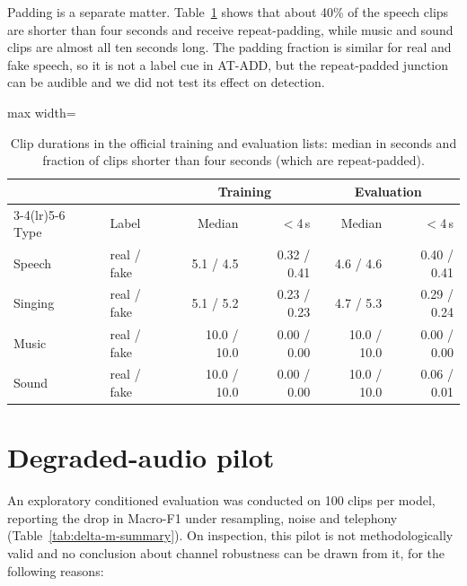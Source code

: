 Padding is a separate matter. Table~\ref{tab:durations} shows that about 40\% of the speech clips are shorter than four seconds and receive repeat-padding, while music and sound clips are almost all ten seconds long. The padding fraction is similar for real and fake speech, so it is not a label cue in AT-ADD, but the repeat-padded junction can be audible and we did not test its effect on detection.

\begin{table}[htbp]
\centering
\caption{Clip durations in the official training and evaluation lists: median in seconds and fraction of clips shorter than four seconds (which are repeat-padded).}
\label{tab:durations}
\small
\begin{adjustbox}{max width=\textwidth}
\begin{tabular}{@{}llrrrr@{}}
\toprule
 & & \multicolumn{2}{c}{Training} & \multicolumn{2}{c}{Evaluation} \\
\cmidrule(lr){3-4}\cmidrule(lr){5-6}
Type & Label & Median & $<$4\,s & Median & $<$4\,s \\
\midrule
Speech & real / fake & 5.1 / 4.5 & 0.32 / 0.41 & 4.6 / 4.6 & 0.40 / 0.41 \\
Singing & real / fake & 5.1 / 5.2 & 0.23 / 0.23 & 4.7 / 5.3 & 0.29 / 0.24 \\
Music & real / fake & 10.0 / 10.0 & 0.00 / 0.00 & 10.0 / 10.0 & 0.00 / 0.00 \\
Sound & real / fake & 10.0 / 10.0 & 0.00 / 0.00 & 10.0 / 10.0 & 0.06 / 0.01 \\
\bottomrule
\end{tabular}
\end{adjustbox}
\end{table}

\section{Degraded-audio pilot}
\label{sec:robustness-pilot}

An exploratory conditioned evaluation was conducted on 100 clips per model, reporting the drop in Macro-F1 under resampling, noise and telephony (Table~\ref{tab:delta-m-summary}). On inspection, this pilot is not methodologically valid and no conclusion about channel robustness can be drawn from it, for the following reasons:

